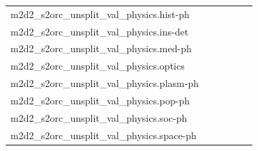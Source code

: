 \documentclass[dvipsnames]{article}
\begin{document}
\begin{appendix}
{\begin{longtable}{m{6cm}m{1.7cm}m{1.7cm}m{1.7cm}m{1.7cm}m{1.7cm}}
	m2d2\_s2orc\_unsplit\_val\_physics.hist-ph  & \colorbox[HTML]{f2fab5}{\makebox[\mywidth][c]{15.57}} & \colorbox[HTML]{dcf1a5}{\makebox[\mywidth][c]{15.43}} & \colorbox[HTML]{ffffe5}{\makebox[\mywidth][c]{16.97}} & \colorbox[HTML]{d5eea1}{\makebox[\mywidth][c]{15.40}} & \colorbox[HTML]{77c578}{\makebox[\mywidth][c]{15.18}}\\
	m2d2\_s2orc\_unsplit\_val\_physics.ins-det  & \colorbox[HTML]{c6e89a}{\makebox[\mywidth][c]{14.01}} & \colorbox[HTML]{e2f3a9}{\makebox[\mywidth][c]{14.16}} & \colorbox[HTML]{ffffe5}{\makebox[\mywidth][c]{16.14}} & \colorbox[HTML]{d4eea0}{\makebox[\mywidth][c]{14.07}} & \colorbox[HTML]{77c578}{\makebox[\mywidth][c]{13.79}}\\
	m2d2\_s2orc\_unsplit\_val\_physics.med-ph  & \colorbox[HTML]{cae99c}{\makebox[\mywidth][c]{14.34}} & \colorbox[HTML]{e1f3a9}{\makebox[\mywidth][c]{14.46}} & \colorbox[HTML]{ffffe5}{\makebox[\mywidth][c]{16.50}} & \colorbox[HTML]{bfe596}{\makebox[\mywidth][c]{14.29}} & \colorbox[HTML]{77c578}{\makebox[\mywidth][c]{14.09}}\\
	m2d2\_s2orc\_unsplit\_val\_physics.optics  & \colorbox[HTML]{c5e799}{\makebox[\mywidth][c]{12.74}} & \colorbox[HTML]{ebf7b0}{\makebox[\mywidth][c]{12.94}} & \colorbox[HTML]{ffffe5}{\makebox[\mywidth][c]{14.64}} & \colorbox[HTML]{d5eea1}{\makebox[\mywidth][c]{12.80}} & \colorbox[HTML]{77c578}{\makebox[\mywidth][c]{12.54}}\\
	m2d2\_s2orc\_unsplit\_val\_physics.plasm-ph  & \colorbox[HTML]{c3e698}{\makebox[\mywidth][c]{13.65}} & \colorbox[HTML]{e2f3a9}{\makebox[\mywidth][c]{13.81}} & \colorbox[HTML]{ffffe5}{\makebox[\mywidth][c]{15.77}} & \colorbox[HTML]{ceeb9e}{\makebox[\mywidth][c]{13.69}} & \colorbox[HTML]{77c578}{\makebox[\mywidth][c]{13.44}}\\
	m2d2\_s2orc\_unsplit\_val\_physics.pop-ph  & \colorbox[HTML]{f2fab5}{\makebox[\mywidth][c]{13.80}} & \colorbox[HTML]{dff2a7}{\makebox[\mywidth][c]{13.67}} & \colorbox[HTML]{ffffe5}{\makebox[\mywidth][c]{15.17}} & \colorbox[HTML]{cdeb9d}{\makebox[\mywidth][c]{13.60}} & \colorbox[HTML]{77c578}{\makebox[\mywidth][c]{13.41}}\\
	m2d2\_s2orc\_unsplit\_val\_physics.soc-ph  & \colorbox[HTML]{b2df90}{\makebox[\mywidth][c]{12.79}} & \colorbox[HTML]{def2a6}{\makebox[\mywidth][c]{12.97}} & \colorbox[HTML]{ffffe5}{\makebox[\mywidth][c]{14.80}} & \colorbox[HTML]{bde395}{\makebox[\mywidth][c]{12.83}} & \colorbox[HTML]{77c578}{\makebox[\mywidth][c]{12.66}}\\
	m2d2\_s2orc\_unsplit\_val\_physics.space-ph  & \colorbox[HTML]{d5eea1}{\makebox[\mywidth][c]{13.00}} & \colorbox[HTML]{e4f4ab}{\makebox[\mywidth][c]{13.09}} & \colorbox[HTML]{ffffe5}{\makebox[\mywidth][c]{14.77}} & \colorbox[HTML]{c2e698}{\makebox[\mywidth][c]{12.94}} & \colorbox[HTML]{77c578}{\makebox[\mywidth][c]{12.76}}\\

\end{longtable}}
\end{appendix}
\end{document}
